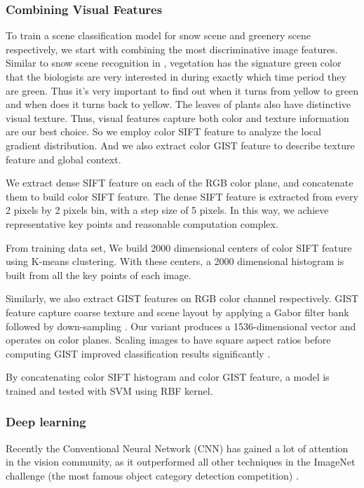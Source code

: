 \subsubsection{Combining Visual Features}
To train a scene classification model for snow scene and greenery scene respectively, we start with 
combining the most discriminative image features. Similar to snow scene recognition in , 
vegetation has the signature green color that the  
biologists are very interested in during exactly which time period they are green. 
Thus it's very important 
to find out when it turns from yellow to green and when does it turns back to yellow.
The leaves of plants also have distinctive visual texture. 
Thus, visual features capture both color and texture information are our best choice.
So we employ color SIFT feature  to analyze the local gradient distribution. 
And we also extract color GIST feature to describe texture feature and global context. 

We extract dense SIFT feature on each of the RGB color plane, and concatenate them to 
build color SIFT feature. The dense SIFT feature is extracted from every 2 pixels by 2 pixels bin, 
with a step size of 5 pixels. In this way, we achieve representative key points and reasonable 
computation complex. 

From training data set, We build 2000 dimensional centers of color SIFT feature 
using K-means clustering. With these centers, a 2000 dimensional histogram is built 
from all the key points of each image.

 Similarly, we also extract GIST features on RGB color channel respectively.
GIST feature capture coarse texture
and scene layout by applying a Gabor filter bank followed by
down-sampling . Our variant produces a
1536-dimensional vector and operates on color planes. Scaling
images to have square aspect ratios before computing GIST improved
classification results significantly .

By concatenating color SIFT histogram and color GIST feature, 
a model is trained and tested with SVM using RBF kernel.

\subsubsection{Deep learning}
Recently the Conventional Neural Network (CNN) 
has gained a lot of attention 
in the vision community, as it outperformed all other techniques in the ImageNet challenge 
(the most famous object category detection competition) .

